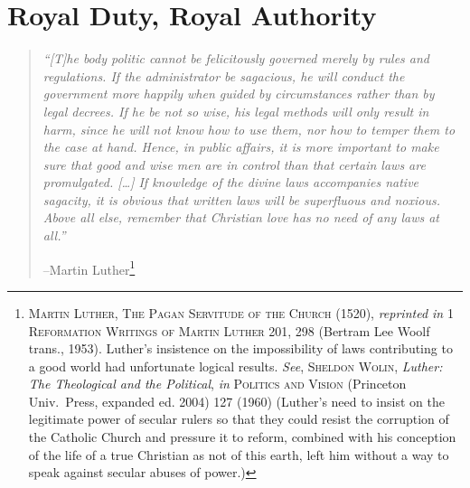 \documentclass[../FGP.tex]{subfiles}
\begin{document}
\section{Royal Duty, Royal Authority}\label{sec:world:royalduty} 
  \begin{quote}{\it
  ``[T]he body politic cannot be felicitously governed merely by rules and regulations. If the administrator be sagacious, he will conduct the government more happily when guided by circumstances rather than by legal decrees. If he be not so wise, his legal methods will only result in harm, since he will not know how to use them, nor how to temper them to the case at hand. Hence, in public affairs, it is more important to make sure that good and wise men are in control than that certain laws are promulgated. [\ldots] If knowledge of the divine laws accompanies native sagacity, it is obvious that written laws will be superfluous and noxious. Above all else, remember that Christian love has no need of any laws at all.''}

  \hfill--Martin Luther\footnote{\textsc{Martin Luther, The Pagan Servitude of the Church} (1520), \textit{reprinted in} 1 \textsc{Reformation Writings of Martin Luther} 201, 298 (Bertram Lee Woolf trans., 1953). Luther's insistence on the impossibility of laws contributing to a good world had unfortunate logical results. \textit{See}, \textsc{Sheldon Wolin}, \textit{Luther: The Theological and the Political}, \textit{in} \textsc{Politics and Vision}  (Princeton Univ.~Press, expanded ed. 2004) 127 (1960) (Luther's need to insist on the legitimate power of secular rulers so that they could resist the corruption of the Catholic Church and pressure it to reform, combined with his conception of the life of a true Christian as not of this earth, left him without a way to speak against secular abuses of power.)}  \end{quote}

\end{document}
